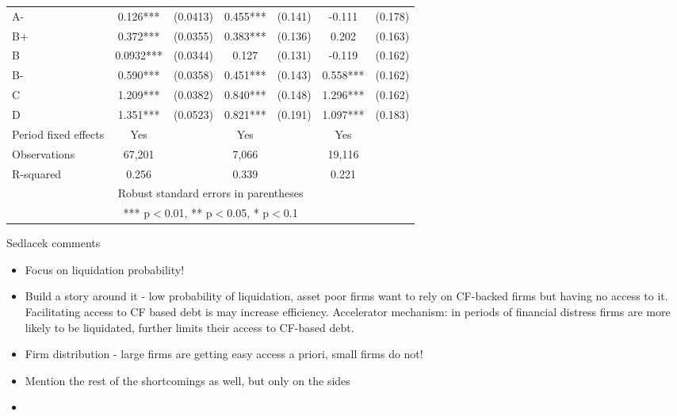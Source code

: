 \documentclass[12pt]{article}
\begin{document}
\begin{table}[H]
{\begin{tabular}{lcccccc}
    A- & 0.126*** & (0.0413) & 0.455*** & (0.141) & -0.111 & (0.178) \\
    B+ & 0.372*** & (0.0355) & 0.383*** & (0.136) & 0.202 & (0.163) \\
    B & 0.0932*** & (0.0344) & 0.127 & (0.131) & -0.119 & (0.162) \\
    B- & 0.590*** & (0.0358) & 0.451*** & (0.143) & 0.558*** & (0.162) \\
    C & 1.209*** & (0.0382) & 0.840*** & (0.148) & 1.296*** & (0.162) \\
    D & 1.351*** & (0.0523) & 0.821*** & (0.191) & 1.097*** & (0.183) \vspace{2mm} \\
    \midrule
    Period fixed effects & Yes & & Yes & & Yes & \\
    Observations & 67,201 & & 7,066 & & 19,116 & \\
    R-squared & 0.256 & & 0.339 & & 0.221 & \\
    \bottomrule
    \multicolumn{7}{c}{Robust standard errors in parentheses} \\
    \multicolumn{7}{c}{*** p$<$0.01, ** p$<$0.05, * p$<$0.1} \\
    \end{tabular}%
    }
\end{table}

Sedlacek comments \\
\begin{itemize}
    \item Focus on liquidation probability!
    \item Build a story around it - low probability of liquidation, asset poor firms want to rely on CF-backed firms but having no access to it. Facilitating access to CF based debt is may increase efficiency. Accelerator mechanism: in periods of financial distress firms are more likely to be liquidated, further limits their access to CF-based debt.  
    \item Firm distribution - large firms are getting easy access a priori, small firms do not! 
    \item Mention the rest of the shortcomings as well, but only on the sides 
    \item 
\end{itemize}
\end{document}
